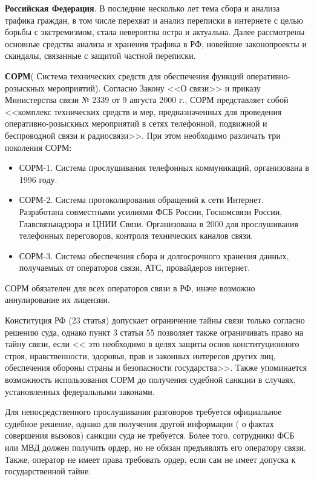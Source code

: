 	
	\textbf{Российская Федерация}.  В последние несколько лет тема сбора и анализа трафика граждан, в том числе перехват и анализ переписки в интернете с целью борьбы с экстремизмом, стала невероятна остра и актуальна. Далее рассмотрены основные средства анализа и хранения трафика  в РФ, новейшие законопроекты и скандалы, связанные с защитой частной переписки. 
	
	\textbf{СОРМ}( Система технических средств для обеспечения функций оперативно-розыскных мероприятий). Согласно Закону <<О связи>> и  приказу Министерства связи № 2339 от 9 августа 2000 г., СОРМ представляет собой <<комплекс технических средств и мер, предназначенных для проведения оперативно-розыскных мероприятий в сетях телефонной, подвижной и беспроводной связи и радиосвязи>>. %
	При этом необходимо различать три поколения СОРМ:
	\begin{itemize}
		\item СОРМ-1. Система прослушивания телефонных коммуникаций, организована в 1996 году.
		\item СОРМ-2.  Система протоколирования обращений к сети Интернет. Разработана совместными усилиями ФСБ России, Госкомсвязи России, Главсвязьнадзора и ЦНИИ Связи. Организована в 2000 для прослушивания телефонных переговоров, контроля технических каналов связи.
		\item СОРМ-3. Система обеспечения сбора и долгосрочного хранения данных, получаемых от операторов  связи, АТС,  провайдеров интернет.  
	\end{itemize}

	СОРМ обязателен для всех операторов связи в РФ, иначе возможно аннулирование их лицензии. %
	
	
	Конституция РФ (23 статья) допускает ограничение тайны связи только согласно решению суда, однако пункт 3 статьи 55 позволяет также ограничивать право на тайну связи, если << это необходимо в целях защиты основ конституционного строя, нравственности, здоровья, прав и законных интересов других лиц, обеспечения обороны страны и безопасности государства>>. Также упоминается возможность использования СОРМ до получения судебной санкции в случаях, установленных федеральными законами. %
	
	Для непосредственного прослушивания разговоров требуется официальное судебное решение, однако для получения другой информации (  о фактах совершения вызовов) санкции суда не требуется. Более того, сотрудники ФСБ или МВД должен получить ордер, но не обязан предъявлять его оператору связи. Также, оператор не имеет права требовать ордер, если сам не имеет допуска к государственной тайне. 
	
